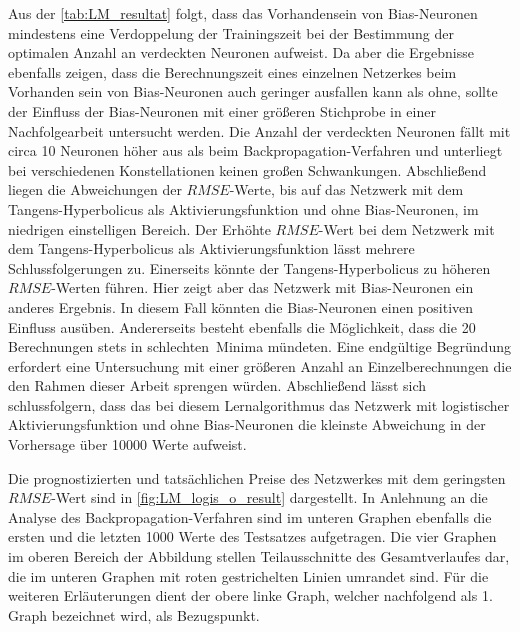 Aus der \autoref{tab:LM_resultat} folgt, dass das Vorhandensein von Bias-Neuronen mindestens eine Verdoppelung der Trainingszeit bei der Bestimmung der optimalen Anzahl an verdeckten Neuronen aufweist. Da aber die Ergebnisse ebenfalls zeigen, dass die Berechnungszeit eines einzelnen Netzerkes beim Vorhanden sein von Bias-Neuronen auch geringer ausfallen kann als ohne, sollte der Einfluss der Bias-Neuronen mit einer größeren Stichprobe in einer Nachfolgearbeit untersucht werden. Die Anzahl der verdeckten Neuronen fällt mit circa 10 Neuronen höher aus als beim Backpropagation-Verfahren und unterliegt bei verschiedenen Konstellationen keinen großen Schwankungen. Abschließend liegen die Abweichungen der $RMSE$-Werte, bis auf das Netzwerk mit dem Tangens-Hyperbolicus als Aktivierungsfunktion und ohne Bias-Neuronen, im niedrigen einstelligen Bereich. Der Erhöhte $RMSE$-Wert bei dem Netzwerk mit dem Tangens-Hyperbolicus als Aktivierungsfunktion lässt mehrere Schlussfolgerungen zu. Einerseits könnte der Tangens-Hyperbolicus zu höheren $RMSE$-Werten führen. Hier zeigt aber das Netzwerk mit Bias-Neuronen ein anderes Ergebnis. In diesem Fall könnten die Bias-Neuronen einen positiven Einfluss ausüben. Andererseits besteht ebenfalls die Möglichkeit, dass die 20 Berechnungen stets in \glqq schlechten\grqq~Minima mündeten. Eine endgültige Begründung erfordert eine Untersuchung mit einer größeren Anzahl an Einzelberechnungen die den Rahmen dieser Arbeit sprengen würden. Abschließend lässt sich schlussfolgern, dass das bei diesem Lernalgorithmus das Netzwerk mit logistischer Aktivierungsfunktion und ohne Bias-Neuronen die kleinste Abweichung in der Vorhersage über 10000 Werte aufweist.

Die prognostizierten und tatsächlichen Preise des Netzwerkes mit dem geringsten $RMSE$-Wert sind in \autoref{fig:LM_logis_o_result} dargestellt. In Anlehnung an die Analyse des Backpropagation-Verfahren sind im unteren Graphen ebenfalls die ersten und die letzten 1000 Werte des Testsatzes aufgetragen. Die vier Graphen im oberen Bereich der Abbildung stellen Teilausschnitte des Gesamtverlaufes dar, die im unteren Graphen mit roten gestrichelten Linien umrandet sind. Für die weiteren Erläuterungen dient der obere linke Graph, welcher nachfolgend als 1. Graph bezeichnet wird, als Bezugspunkt.

\begin{figure}[!htb]
    \centering
        
    \caption{}
    \label{fig:LM_logis_o_result}
\end{figure}

